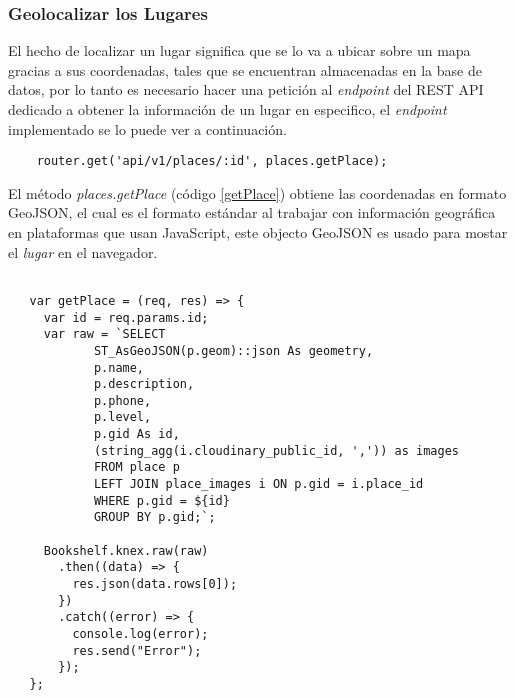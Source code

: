 

\subsubsection{Geolocalizar los Lugares}
\label{sub:fronted_lugares}

El hecho de localizar un lugar significa que se lo va a ubicar sobre un mapa gracias a sus coordenadas, tales que se encuentran almacenadas en la base de datos, por lo tanto es necesario hacer una petición al \emph{endpoint} del REST API dedicado a obtener la información de un lugar en especifico, el \emph{endpoint} implementado se lo puede ver a continuación. \\

\begin{center}
  \begin{verbatim}
    router.get('api/v1/places/:id', places.getPlace);
  \end{verbatim}
\end{center}

El método \emph{places.getPlace} (c\'odigo \ref{getPlace}) obtiene las coordenadas en formato GeoJSON, el cual es el formato estándar al trabajar con información geográfica en plataformas que usan JavaScript, este objecto GeoJSON es usado para mostar el \emph{lugar} en el navegador. \\

\begin{center}
 \begin{lstlisting}[label=getPlace,caption=Método para obtener la información de un lugar.]

   var getPlace = (req, res) => {
     var id = req.params.id;
     var raw = `SELECT
            ST_AsGeoJSON(p.geom)::json As geometry,
            p.name,
            p.description,
            p.phone,
            p.level,
            p.gid As id,
            (string_agg(i.cloudinary_public_id, ',')) as images
            FROM place p
            LEFT JOIN place_images i ON p.gid = i.place_id
            WHERE p.gid = ${id}
            GROUP BY p.gid;`;

     Bookshelf.knex.raw(raw)
       .then((data) => {
         res.json(data.rows[0]);
       })
       .catch((error) => {
         console.log(error);
         res.send("Error");
       });
   };

 \end{lstlisting}
\end{center}


